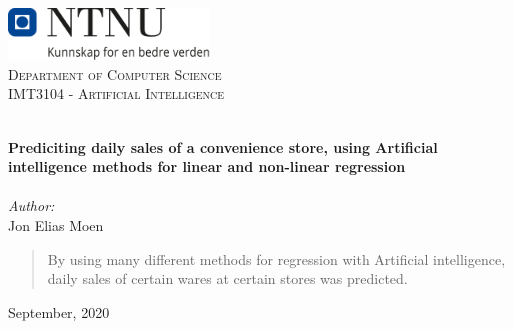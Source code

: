 
\begin{titlepage}
\vbox{ }
\vbox{ }
\begin{center}
\includegraphics[width=0.40\textwidth]{Images/NTNU_logo.png}\\[1cm]
\textsc{\LARGE Department of Computer Science}\\[1.5cm]
\textsc{\Large IMT3104 - Artificial Intelligence}\\[0.5cm]
\vbox{ }

\HRule \\[0.4cm]
{ \huge \bfseries Prediciting daily sales of a convenience store, using Artificial intelligence methods for linear and non-linear regression}\\[0.4cm]
\HRule \\[1.5cm]

\large
\emph{Author:}\\
Jon Elias Moen

\begin{abstract}
    By using many different methods for regression with Artificial intelligence, daily sales of certain wares at certain stores was predicted.
\end{abstract}

\vfill

{\large September, 2020}
\end{center}
\end{titlepage}